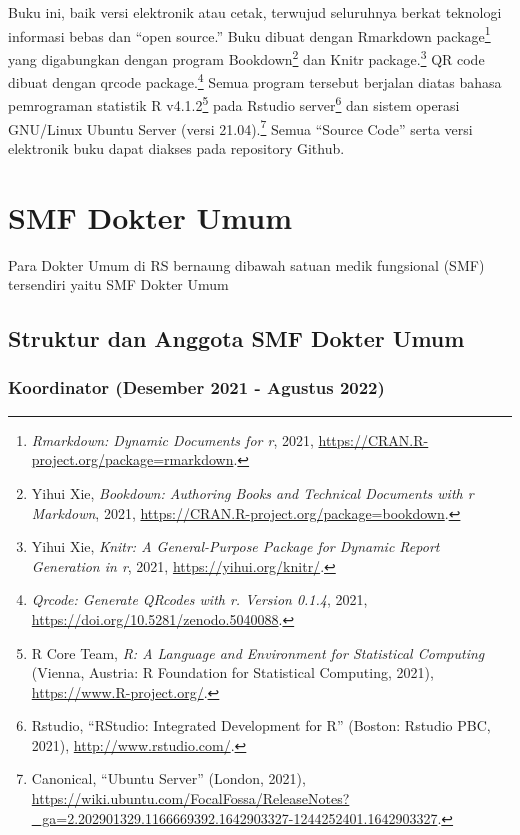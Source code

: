 \documentclass[
]{book}
\begin{document}
Buku ini, baik versi elektronik atau cetak, terwujud seluruhnya berkat teknologi informasi bebas dan ``open source.'' Buku dibuat dengan Rmarkdown package\footnote{\emph{Rmarkdown: Dynamic Documents for r}, 2021, \url{https://CRAN.R-project.org/package=rmarkdown}.} yang digabungkan dengan program Bookdown\footnote{Yihui Xie, \emph{Bookdown: Authoring Books and Technical Documents with r Markdown}, 2021, \url{https://CRAN.R-project.org/package=bookdown}.} dan Knitr package.\footnote{Yihui Xie, \emph{Knitr: A General-Purpose Package for Dynamic Report Generation in r}, 2021, \url{https://yihui.org/knitr/}.} QR code dibuat dengan qrcode package.\footnote{\emph{Qrcode: Generate QRcodes with r. Version 0.1.4}, 2021, \url{https://doi.org/10.5281/zenodo.5040088}.} Semua program tersebut berjalan diatas bahasa pemrograman statistik R v4.1.2\footnote{R Core Team, \emph{R: A Language and Environment for Statistical Computing} (Vienna, Austria: R Foundation for Statistical Computing, 2021), \url{https://www.R-project.org/}.} pada Rstudio server\footnote{Rstudio, {``{RStudio}: {Integrated} {Development} for {R}''} (Boston: Rstudio PBC, 2021), \url{http://www.rstudio.com/}.} dan sistem operasi GNU/Linux Ubuntu Server (versi 21.04).\footnote{Canonical, {``Ubuntu {Server}''} (London, 2021), \url{https://wiki.ubuntu.com/FocalFossa/ReleaseNotes?_ga=2.202901329.1166669392.1642903327-1244252401.1642903327}.} Semua ``Source Code'' serta versi elektronik buku dapat diakses pada repository Github.

\hypertarget{smf-dokter-umum}{%
\chapter{SMF Dokter Umum}\label{smf-dokter-umum}}

Para Dokter Umum di RS bernaung dibawah satuan medik fungsional (SMF) tersendiri yaitu SMF Dokter Umum

\hypertarget{struktur-dan-anggota-smf-dokter-umum}{%
\section{Struktur dan Anggota SMF Dokter Umum}\label{struktur-dan-anggota-smf-dokter-umum}}

\hypertarget{koordinator-desember-2021---agustus-2022}{%
\subsection{Koordinator (Desember 2021 - Agustus 2022)}\label{koordinator-desember-2021---agustus-2022}}
\end{document}
